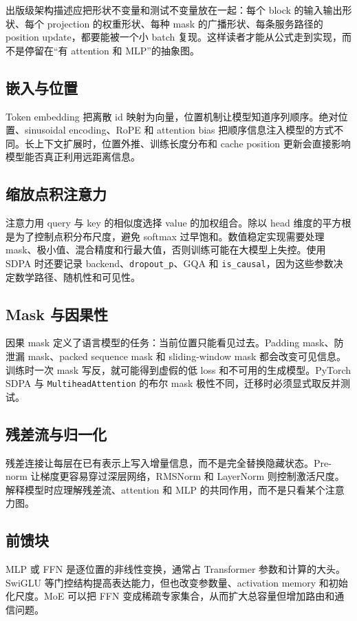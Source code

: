 \documentclass[UTF8,zihao=-4,openany]{ctexbook}
\begin{document}
出版级架构描述应把形状不变量和测试不变量放在一起：每个 block 的输入输出形状、每个 projection 的权重形状、每种 mask 的广播形状、每条服务路径的 position update，都要能被一个小 batch 复现。这样读者才能从公式走到实现，而不是停留在“有 attention 和 MLP”的抽象图。

\subsection{嵌入与位置}
Token embedding 把离散 id 映射为向量，位置机制让模型知道序列顺序。绝对位置、sinusoidal encoding、RoPE 和 attention bias 把顺序信息注入模型的方式不同。长上下文扩展时，位置外推、训练长度分布和 cache position 更新会直接影响模型能否真正利用远距离信息。

\subsection{缩放点积注意力}
注意力用 query 与 key 的相似度选择 value 的加权组合。除以 head 维度的平方根是为了控制点积分布尺度，避免 softmax 过早饱和。数值稳定实现需要处理 mask、极小值、混合精度和行最大值，否则训练可能在大模型上失控。使用 SDPA 时还要记录 backend、\texttt{dropout\_p}、GQA 和 \texttt{is\_causal}，因为这些参数决定数学路径、随机性和可见性。

\subsection{Mask 与因果性}
因果 mask 定义了语言模型的任务：当前位置只能看见过去。Padding mask、防泄漏 mask、packed sequence mask 和 sliding-window mask 都会改变可见信息。训练时一次 mask 写反，就可能得到虚假的低 loss 和不可用的生成模型。PyTorch SDPA 与 \texttt{MultiheadAttention} 的布尔 mask 极性不同，迁移时必须显式取反并测试。

\subsection{残差流与归一化}
残差连接让每层在已有表示上写入增量信息，而不是完全替换隐藏状态。Pre-norm 让梯度更容易穿过深层网络，RMSNorm 和 LayerNorm 则控制激活尺度。解释模型时应理解残差流、attention 和 MLP 的共同作用，而不是只看某个注意力图。

\subsection{前馈块}
MLP 或 FFN 是逐位置的非线性变换，通常占 Transformer 参数和计算的大头。SwiGLU 等门控结构提高表达能力，但也改变参数量、activation memory 和初始化尺度。MoE 可以把 FFN 变成稀疏专家集合，从而扩大总容量但增加路由和通信问题。
\end{document}
